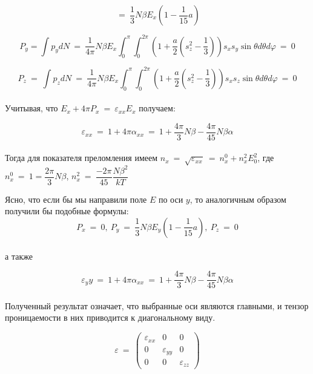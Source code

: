 \documentclass[a4paper, 12pt]{article}
\renewcommand{\phi}{\varphi}
\newcommand{\eps}{\varepsilon}
\begin{document}
\begin{enumerate}
              \[
                  ~=~ \dfrac{1}{3} N \beta E_x \left( 1 - \dfrac{1}{15} a \right)
              \]

              \[
                  P_y = \int p_y dN ~=~ \dfrac{1}{4 \pi} N \beta E_x \int_0^{\pi} \int_0^{2 \pi} \left( 1 + \dfrac{a}{2} \left( s_z^2 - \dfrac{1}{3} \right) \right) s_x s_y \sin \theta d \theta d \phi ~=~ 0
              \]

              \[
                  P_z ~=~ \int p_z dN ~=~ \dfrac{1}{4 \pi} N \beta E_x \int_0^{\pi} \int_0^{2 \pi} \left( 1 + \dfrac{a}{2} \left( s_z^2 - \dfrac{1}{3} \right) \right) s_x s_z \sin \theta d \theta d \phi ~=~ 0
              \]\\

            Учитывая, что $E_x + 4 \pi P_x ~=~ \eps_{xx} E_x$ получаем:
            
            \[
                \eps_{xx} ~=~ 1 + 4 \pi \alpha_{xx} ~=~ 1 + \dfrac{4 \pi}{3} N \beta - \dfrac{4 \pi}{45} N \beta \alpha
            \]\\

            Тогда для показателя преломления имеем $n_x ~=~ \sqrt{\eps_{xx}} ~=~ n_x^0 + n_x^2 E_0^2$, где $n_x^0 ~=~ 1 = \dfrac{2 \pi}{3} N \beta$, $n_x^2 ~=~ \dfrac{-2 \pi}{45} \dfrac{N \beta^2}{k T}$

            Ясно, что если бы мы направили поле $E$ по оси $y$, то аналогичным образом получили бы подобные формулы:\\

            \[
                P_x ~=~ 0,~ P_y ~=~ \dfrac{1}{3} N \beta E_y \left( 1 - \dfrac{1}{15}a \right),~ P_z ~=~ 0
            \]\\

            а также

            \[
                \eps_yy ~=~ 1 + 4 \pi \alpha_{xx} ~=~ 1 + \dfrac{4 \pi}{3} N \beta - \dfrac{4 \pi}{45} N \beta \alpha
            \]\\

            Полученный результат означает, что выбранные оси являются главными, и тензор проницаемости в них приводится к диагональному виду.
    \end{enumerate}

    \[
        \eps ~=~
        \begin{pmatrix}
        \eps_{xx} & 0 & 0 \\
        0 & \eps_{yy} & 0 \\
        0 & 0 & \eps_{zz}
        \end{pmatrix}
    \]\\
\end{document}
